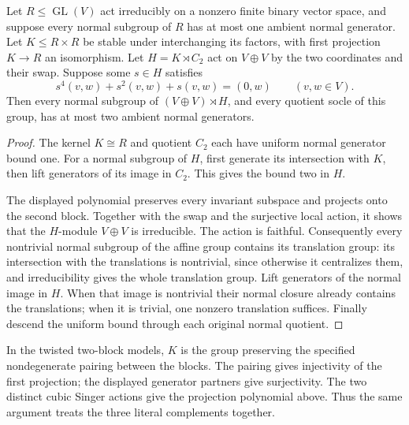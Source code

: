 \begin{lemma}
\label{lem:paired-form-swap-generators}
Let $R\leq\operatorname{GL}(V)$ act irreducibly on a nonzero finite
binary vector space, and suppose every normal subgroup of $R$ has
at most one ambient normal generator. Let $K\leq R\times R$ be
stable under interchanging its factors, with first projection
$K\to R$ an isomorphism. Let $H=K\rtimes C_2$ act on $V\oplus V$
by the two coordinates and their swap. Suppose some $s\in H$ satisfies
\[
 s^4(v,w)+s^2(v,w)+s(v,w)=(0,w)
 \qquad(v,w\in V).
\]
Then every normal subgroup of $(V\oplus V)\rtimes H$, and every
quotient socle of this group, has at most two ambient normal generators.
\end{lemma}
\begin{proof}
The kernel $K\cong R$ and quotient $C_2$ each have uniform normal
generator bound one. For a normal subgroup of $H$, first generate
its intersection with $K$, then lift generators of its image in $C_2$.
This gives the bound two in $H$.

The displayed polynomial preserves every invariant subspace and
projects onto the second block. Together with the swap and the
surjective local action, it shows that the $H$-module $V\oplus V$
is irreducible. The action is faithful. Consequently every nontrivial
normal subgroup of the affine group contains its translation group:
its intersection with the translations is nontrivial, since otherwise
it centralizes them, and irreducibility gives the whole translation
group. Lift generators of the normal image in $H$. When that image
is nontrivial their normal closure already contains the translations;
when it is trivial, one nonzero translation suffices. Finally descend
the uniform bound through each original normal quotient.
\end{proof}

In the twisted two-block models, $K$ is the group preserving the
specified nondegenerate pairing between the blocks. The pairing gives
injectivity of the first projection; the displayed generator partners
give surjectivity. The two distinct cubic Singer actions give the
projection polynomial above. Thus the same argument treats the three
literal complements together.

